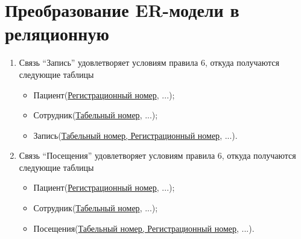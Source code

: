 \documentclass[14pt,a4paper,russian]{extreport}
\begin{document}
\section{Преобразование ER-модели в реляционную}
\begin{enumerate}
    \item Связь ``Запись'' удовлетворяет условиям правила 6, откуда получаются следующие
        таблицы
        \begin{itemize}
            \item Пациент(\underline{Регистрационный номер}, ...);
            \item Сотрудник(\underline{Табельный номер}, ...);
            \item Запись(\underline{Табельный номер, Регистрационный номер}, ...).
        \end{itemize}
    \item Связь ``Посещения'' удовлетворяет условиям правила 6, откуда получаются следующие
        таблицы
        \begin{itemize}
            \item Пациент(\underline{Регистрационный номер}, ...);
            \item Сотрудник(\underline{Табельный номер}, ...);
            \item Посещения(\underline{Табельный номер, Регистрационный номер}, ...).
        \end{itemize}


\end{enumerate}
\end{document}
